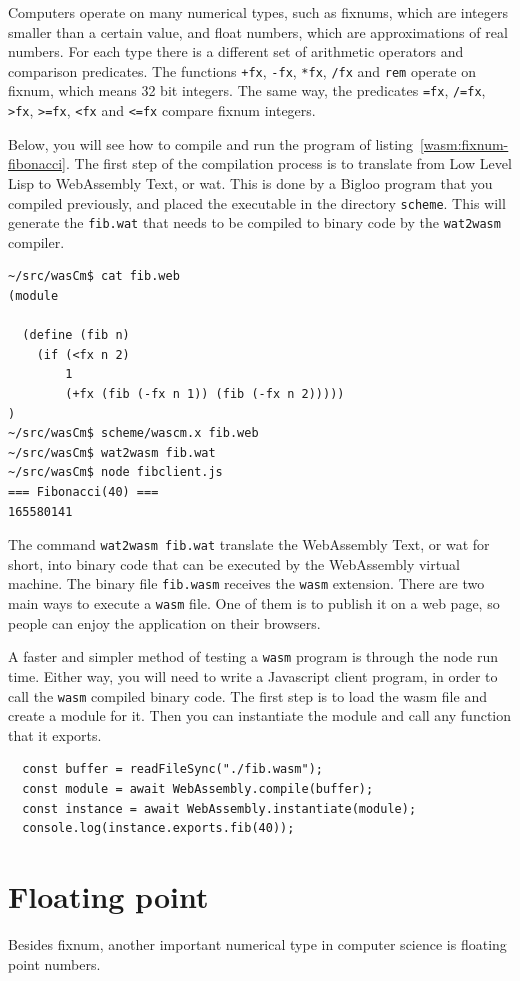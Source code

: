 \documentclass[a4paper,12pt]{book}
\begin{document}
Computers operate on many numerical types, such
as fixnums, which are integers smaller than a certain
value, and float numbers, which are approximations
of real numbers. For each type there is
a different set of arithmetic operators and
comparison predicates. The functions \verb|+fx|,
\verb|-fx|, \verb|*fx|, \verb|/fx| and
\verb|rem| operate on fixnum, which means 32 bit
integers. The same way, the predicates \verb|=fx|,
\verb|/=fx|, \verb|>fx|, \verb|>=fx|, \verb|<fx|
and \verb|<=fx| compare fixnum integers.


Below, you will see how to compile and run the
program of listing~\ref{wasm:fixnum-fibonacci}.
The first step of the compilation process is to
translate from Low Level Lisp to WebAssembly Text,
or wat. This is done by a Bigloo program that
you compiled previously, and placed the executable
in the directory \verb|scheme|. This will generate
the \verb|fib.wat| that needs to be compiled to
binary code by the \verb|wat2wasm| compiler.
\begin{verbatim}
~/src/wasCm$ cat fib.web
(module

  (define (fib n)
    (if (<fx n 2)
        1
        (+fx (fib (-fx n 1)) (fib (-fx n 2)))))
)
~/src/wasCm$ scheme/wascm.x fib.web
~/src/wasCm$ wat2wasm fib.wat
~/src/wasCm$ node fibclient.js
=== Fibonacci(40) ===
165580141
\end{verbatim}

The command \verb|wat2wasm fib.wat| translate the
WebAssembly Text, or wat for short, into binary
code that can be executed by the WebAssembly virtual
machine. The binary file \verb|fib.wasm| receives
the \verb|wasm| extension. There are two main ways
to execute a \verb|wasm| file. One of them is to
publish it on a web page, so people can enjoy the
application on their browsers.

A faster and simpler method of testing a \verb|wasm|
program is through the node run time. Either way, you
will need to write a Javascript client program, in
order to call the \verb|wasm| compiled binary code.
The first step is to load the wasm file and create a
module for it. Then you can instantiate the module
and call any function that it exports.
\begin{verbatim}
  const buffer = readFileSync("./fib.wasm");
  const module = await WebAssembly.compile(buffer);
  const instance = await WebAssembly.instantiate(module);
  console.log(instance.exports.fib(40));
\end{verbatim}

\section{Floating point}
Besides fixnum, another important numerical type in
computer science is floating point numbers.
\end{document}
